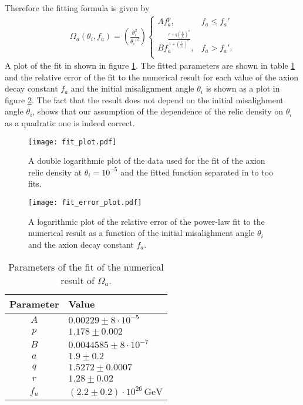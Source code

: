 \documentclass[twoside,a4paper, 12pt]{article}
\numberwithin{equation}{section}
\begin{document}
Therefore the fitting formula is given by
\begin{align}
    \label{eq:fitting_formula}
    \boxed{
    \Omega_a(\theta_i, f_a) = 
    \left( \frac{\theta_i^2}{\theta_i'^2} \right)
   \begin{cases} 
      A f_a^p, & f_a \leq f_a' \\
      B f_a^{\frac{r + q \left( \frac{f_a}{f_u} \right)^a}{1 + \left( \frac{f_a}{f_u} \right)^a }}, & f_a > f_a'. \\
   \end{cases} 
   }
\end{align}
A plot of the fit in shown in figure \ref{fig:fit_plot}.
The fitted parameters are shown in table \ref{tab:fit_parameters} and the relative error of the fit to the numerical result
for each value of the axion decay constant $f_a$ and the initial misalignment angle $\theta_i$ is shown as
a plot in figure \ref{fig:fit_relative_error}.
The fact that the result does not depend on the initial
misalighment angle $\theta_i$, shows that our assumption
of the dependence of the relic density on $\theta_i$ 
as a quadratic one is indeed correct.
\begin{figure}[H]
    \centering
    \texttt{[image: fit\_plot.pdf]}
    \caption{A double logarithmic plot of the data used for the fit of the axion relic density at $\theta_i = 10^{-5}$ and the fitted function separated in to too fits.}
    \label{fig:fit_plot}
\end{figure}

\begin{figure}[H]
    \centering
    \texttt{[image: fit\_error\_plot.pdf]}
    \caption{A logarithmic plot of the relative error of the power-law fit to the numerical result as
    a function of the initial misalighment angle $\theta_i$ and the axion decay constant $f_a$.}
    \label{fig:fit_relative_error}
\end{figure}


\begin{table}[H]
    \caption{Parameters of the fit of the numerical result of $\Omega_a$.}
    \centering
    \begin{tabular}{c|l}
        Parameter & Value \\
        \hline
        $A$ &   $0.00229   \pm 8 \cdot 10^{-5}$ \\
        $p$ &   $1.178 \pm 0.002   $ \\
        $B$ &   $0.0044585 \pm 8 \cdot 10^{-7}$ \\
        $a$ &   $1.9 \pm 0.2       $ \\
        $q$ &   $1.5272 \pm 0.0007 $  \\
        $r$ &   $1.28 \pm 0.02     $ \\
        $f_u$ & $(2.2 \pm 0.2) \cdot 10^{26} \, \mathrm{GeV}$
    \end{tabular}
    \label{tab:fit_parameters}
\end{table}
\end{document}
